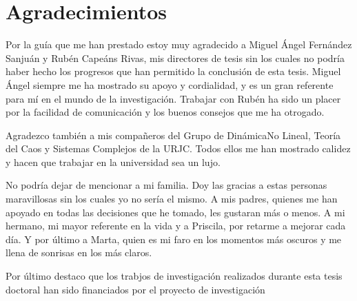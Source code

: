 \chapter*{Agradecimientos}

Por la guía que me han prestado estoy muy agradecido a Miguel Ángel Fernández Sanjuán y Rubén Capeáns Rivas, mis directores de tesis sin los cuales no podría haber hecho los progresos que han permitido la conclusión de esta tesis. Miguel Ángel siempre me ha mostrado su apoyo y cordialidad, y es un gran referente para mí en el mundo de la investigación. Trabajar con Rubén ha sido un placer por la facilidad de comunicación y los buenos consejos que me ha otrogado.


Agradezco también a mis compañeros del Grupo de DinámicaNo Lineal, Teoría del Caos y Sistemas Complejos de la URJC. Todos ellos me han mostrado calidez y hacen que trabajar en la universidad sea un lujo.


No podría dejar de mencionar a mi familia. Doy las gracias a estas personas maravillosas sin los cuales yo no sería el mismo. A mis padres, quienes me han apoyado en todas las decisiones que he tomado, les gustaran más o menos. A mi hermano, mi mayor referente en la vida y a Priscila, por retarme a mejorar cada día. Y por último a Marta, quien es mi faro en los momentos más oscuros y me llena de sonrisas en los más claros.


Por último destaco que los trabjos de investigación realizados durante esta tesis doctoral han sido financiados por el proyecto de investigación %